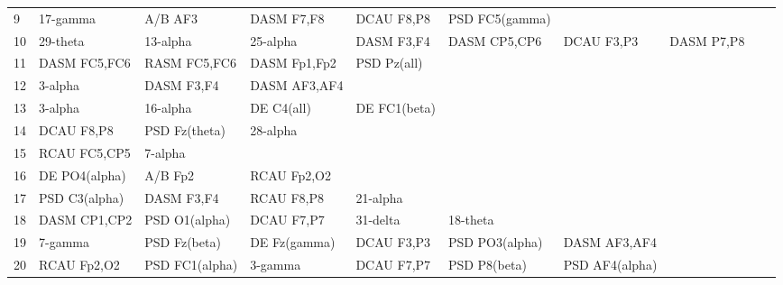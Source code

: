 \begin{landscape}
\begin{table}[]
\begin{tabular}{l|llllllll}
9        & 17-gamma       & A/B AF3        & DASM F7,F8     & DCAU F8,P8     & PSD FC5(gamma) &                &               &                &               &               \\
10       & 29-theta       & 13-alpha       & 25-alpha       & DASM F3,F4     & DASM CP5,CP6   & DCAU F3,P3     & DASM P7,P8    &                &               &               \\
11       & DASM FC5,FC6   & RASM FC5,FC6   & DASM Fp1,Fp2   & PSD Pz(all)    &                &                &               &                &               &               \\
12       & 3-alpha        & DASM F3,F4     & DASM AF3,AF4   &                &                &                &               &                &               &               \\
13       & 3-alpha        & 16-alpha       & DE C4(all)     & DE FC1(beta)   &                &                &               &                &               &               \\
14       & DCAU F8,P8     & PSD Fz(theta)  & 28-alpha       &                &                &                &               &                &               &               \\
15       & RCAU FC5,CP5   & 7-alpha        &                &                &                &                &               &                &               &               \\
16       & DE PO4(alpha)  & A/B Fp2        & RCAU Fp2,O2    &                &                &                &               &                &               &               \\
17       & PSD C3(alpha)  & DASM F3,F4     & RCAU F8,P8     & 21-alpha       &                &                &               &                &               &               \\
18       & DASM CP1,CP2   & PSD O1(alpha)  & DCAU F7,P7     & 31-delta       & 18-theta       &                &               &                &               &               \\
19       & 7-gamma        & PSD Fz(beta)   & DE Fz(gamma)   & DCAU F3,P3     & PSD PO3(alpha) & DASM AF3,AF4   &               &                &               &               \\
20       & RCAU Fp2,O2    & PSD FC1(alpha) & 3-gamma        & DCAU F7,P7     & PSD P8(beta)   & PSD AF4(alpha) &               &                &               &               \\

\end{tabular}
\end{table}
\end{landscape}
